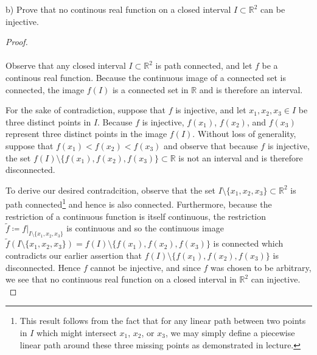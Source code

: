 \pagebreak


b) Prove that no continous real function on a closed interval $I \subset \mathbb{R}^2$ can be injective.

\begin{proof}\ \\\\
    Observe that any closed interval $I \subset \mathbb{R}^2$ is path connected, and let $f$ be a \linebreak
    continous real function. Because the continuous image of a connected set is connected, the image $f(I)$ is a 
    connected set in $\mathbb{R}$ and is therefore an interval.
    
    For the sake of contradiction, suppose that $f$ is injective, and let $x_1, x_2, x_3 \in I$ be three distinct points
    in $I$. Because $f$ is injective, $f(x_1)$, $f(x_2)$, and $f(x_3)$ represent three distinct points in the image 
    $f(I)$. Without loss of generality, suppose that \linebreak
    $f(x_1) < f(x_2) < f(x_3)$ and observe that because $f$ is injective, the set \linebreak
    $f(I) \setminus \{ f(x_1), f(x_2), f(x_3) \} \subset \mathbb{R}$ is not an interval and is therefore disconnected.
    
    To derive our desired contradcition, observe that the set 
    $I \setminus \{x_1, x_2, x_3\} \subset \mathbb{R}^2$ is path connected\footnote{
        This result follows from the fact that for any linear path between two points in $I$ which might intersect 
        $x_1$, $x_2$, or $x_3$, we may simply define a piecewise linear path around these three missing points as 
        demonstrated in lecture.
    } and hence is also connected. Furthermore, because the restriction of a continuous function is itself continuous, 
    the restriction $\tilde{f} \coloneqq f\vert_{I \setminus \{x_1, x_2, x_3\}}$ \linebreak
    is continuous and so the continuous image
    $\tilde{f}(I \setminus \{x_1,x_2,x_3\}) = f(I) \setminus \{f(x_1),f(x_2),f(x_3)\}$
    is connected which contradicts our earlier assertion that $f(I) \setminus \{ f(x_1), f(x_2), f(x_3) \}$ is 
    disconnected. Hence $f$ cannot be injective, and since $f$ was chosen to be arbitrary, we see that no continuous 
    real function on a closed interval in $\mathbb{R}^2$ can injective.
    \ \\
\end{proof}
